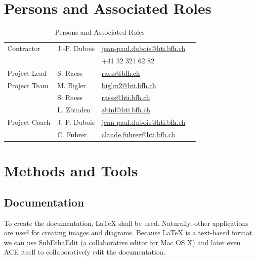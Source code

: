 \documentclass[11pt,a4paper]{article}
\begin{document}
\appendix

\section{Persons and Associated Roles}

\begin{table}[H]
 \begin{center}
 \begin{tabular}{|l|l|l|l|}
 \hline
 Contractor             &  J.-P. Dubois     & \href{mailto:doj@bfh.ch}{jean-paul.dubois@hti.bfh.ch} \\
                        &                   &  +41 32 321 62 82 \\
 \hline
 Project Lead           &  S. Raess         & \href{mailto:rasss@bfh.ch}{rasss@bfh.ch} \\
 \hline
 Project Team           &  M. Bigler        & \href{mailto:biglm2@bfh.ch}{biglm2@hti.bfh.ch} \\ 
                        &  S. Raess         & \href{mailto:rasss@bfh.ch}{rasss@hti.bfh.ch} \\
                        &  L. Zbinden       & \href{mailto:zbinl@bfh.ch}{zbinl@hti.bfh.ch} \\
 \hline
 Project Coach          &  J.-P. Dubois     & \href{mailto:doj@bfh.ch}{jean-paul.dubois@hti.bfh.ch} \\
                        &  C. Fuhrer        & \href{frc@bfh.ch}{claude.fuhrer@hti.bfh.ch} \\
 \hline
 \end{tabular}
 \end{center}
 \caption{Persons and Associated Roles}
 \label{table: Persons and Associated Roles}
\end{table}


\section{Methods and Tools}

\subsection{Documentation}
To create the documentation, \LaTeX{} shall be used. Naturally, other 
applications are used for creating images and diagrams. Because \LaTeX{} is a 
text-based format we can use SubEthaEdit (a collaborative editor for Mac OS X) 
and later even ACE itself to collaboratively edit the documentation. 
\end{document}
